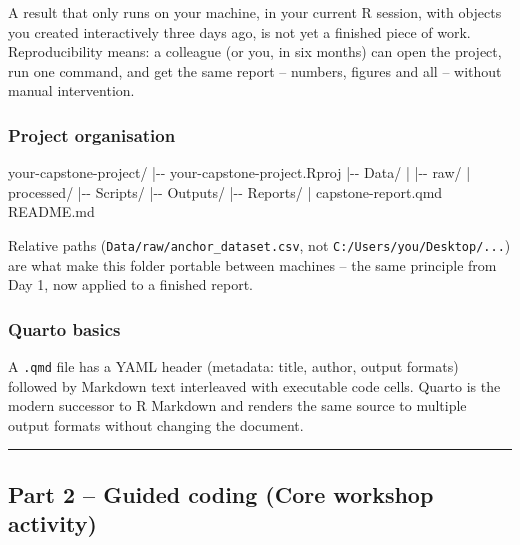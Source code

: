 \documentclass[11pt]{article}
\newenvironment{Shaded}{\begin{snugshade}}{\end{snugshade}}
\newcommand{\NormalTok}[1]{#1}
\begin{document}
A result that only runs on your machine, in your current R session, with
objects you created interactively three days ago, is not yet a finished
piece of work. Reproducibility means: a colleague (or you, in six
months) can open the project, run one command, and get the same report
-- numbers, figures and all -- without manual intervention.

\hypertarget{project-organisation}{%
\subsubsection{Project organisation}\label{project-organisation}}

\begin{Shaded}
\begin{Highlighting}[]
\NormalTok{your{-}capstone{-}project/}
\NormalTok{|{-}{-} your{-}capstone{-}project.Rproj}
\NormalTok{|{-}{-} Data/}
\NormalTok{|   |{-}{-} raw/}
\NormalTok{|   \textasciigrave{}{-}{-} processed/}
\NormalTok{|{-}{-} Scripts/}
\NormalTok{|{-}{-} Outputs/}
\NormalTok{|{-}{-} Reports/}
\NormalTok{|   \textasciigrave{}{-}{-} capstone{-}report.qmd}
\NormalTok{\textasciigrave{}{-}{-} README.md}
\end{Highlighting}
\end{Shaded}

Relative paths (\texttt{Data/raw/anchor\_dataset.csv}, not
\texttt{C:/Users/you/Desktop/...}) are what make this folder portable
between machines -- the same principle from Day 1, now applied to a
finished report.

\hypertarget{quarto-basics}{%
\subsubsection{Quarto basics}\label{quarto-basics}}

A \texttt{.qmd} file has a YAML header (metadata: title, author, output
formats) followed by Markdown text interleaved with executable code
cells. Quarto is the modern successor to R Markdown and renders the same
source to multiple output formats without changing the document.

\begin{center}\rule{0.5\linewidth}{0.5pt}\end{center}

\hypertarget{part-2-guided-coding-core-workshop-activity}{%
\subsection{Part 2 -- Guided coding (Core workshop
activity)}\label{part-2-guided-coding-core-workshop-activity}}
\end{document}
